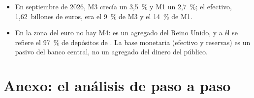 \documentclass[11pt]{article}
\begin{document}
\begin{itemize}
\item En septiembre de 2026, M3 crecía un 3,5~\% y M1 un 2,7~\%\nocite{BCE2026Agregados}; el efectivo, 1,62~billones de euros, era el 9~\% de M3 y el 14~\% de M1\nocite{BCE2026BSI}.
\item En la zona del euro no hay M4: es un agregado del Reino Unido, y a él se refiere el 97~\% de depósitos de \textcite{McLeayRadiaThomas2014Money}. La base monetaria (efectivo y reservas) es un pasivo del banco central, no un agregado del dinero del público.
\end{itemize}

\section{Anexo: el análisis de  paso a paso}\label{anexo:poole}
\end{document}
